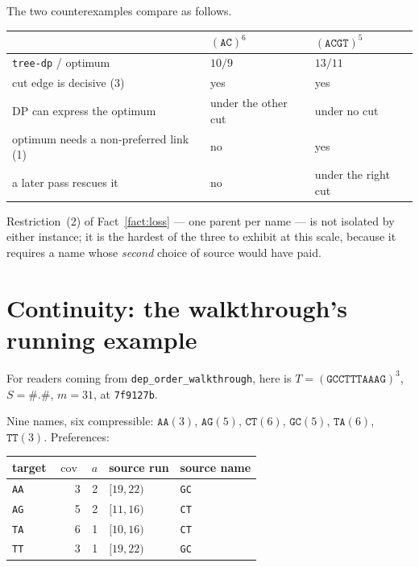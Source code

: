\documentclass[11pt,a4paper]{article}
\theoremstyle{definition}
\theoremstyle{plain}
\theoremstyle{remark}
\newcommand{\cov}{\operatorname{cov}}
\begin{document}
The two counterexamples compare as follows.

\begin{center}
\small
\begin{tabular}{p{6.1cm}ll}
\toprule
& $(\mathtt{AC})^6$ & $(\mathtt{ACGT})^5$ \\
\midrule
\texttt{tree-dp} / optimum & $10 / 9$ & $13 / 11$ \\
cut edge is decisive (3) & yes & yes \\
DP can express the optimum & under the other cut & under no cut \\
optimum needs a non-preferred link (1) & no & yes \\
a later pass rescues it & no & under the right cut \\
\bottomrule
\end{tabular}
\end{center}

Restriction~(2) of Fact~\ref{fact:loss} --- one parent per name --- is
not isolated by either instance; it is the hardest of the three to
exhibit at this scale, because it requires a name whose \emph{second}
choice of source would have paid.

\section{Continuity: the walkthrough's running example}
\label{sec:continuity}

For readers coming from \texttt{dep\_order\_walkthrough}, here is
$T = (\mathtt{GCCTTTAAAG})^3$, $S = \mathtt{\#.\#}$, $m = 31$, at
\texttt{7f9127b}.

Nine names, six compressible: $\mathtt{AA}(3)$, $\mathtt{AG}(5)$,
$\mathtt{CT}(6)$, $\mathtt{GC}(5)$, $\mathtt{TA}(6)$, $\mathtt{TT}(3)$.
Preferences:

\begin{center}
\begin{tabular}{lrrll}
\toprule
target & $\cov$ & $a$ & source run & source name \\
\midrule
\texttt{AA} & 3 & 2 & $[19,22)$ & \texttt{GC} \\
\texttt{AG} & 5 & 2 & $[11,16)$ & \texttt{CT} \\
\texttt{TA} & 6 & 1 & $[10,16)$ & \texttt{CT} \\
\texttt{TT} & 3 & 1 & $[19,22)$ & \texttt{GC} \\
\bottomrule
\end{tabular}
\end{center}
\end{document}

